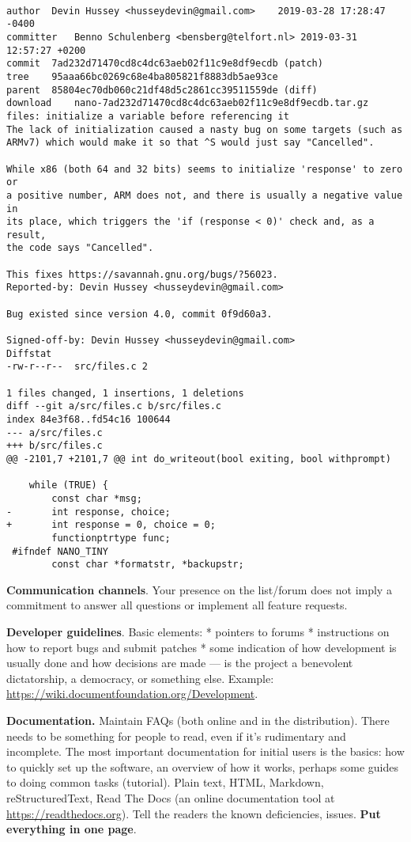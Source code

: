 \documentclass[landscape,30pt]{foils}
\begin{document}
{\tiny
\begin{verbatim}

author	Devin Hussey <husseydevin@gmail.com>	2019-03-28 17:28:47 -0400
committer	Benno Schulenberg <bensberg@telfort.nl>	2019-03-31 12:57:27 +0200
commit	7ad232d71470cd8c4dc63aeb02f11c9e8df9ecdb (patch)
tree	95aaa66bc0269c68e4ba805821f8883db5ae93ce
parent	85804ec70db060c21df48d5c2861cc39511559de (diff)
download	nano-7ad232d71470cd8c4dc63aeb02f11c9e8df9ecdb.tar.gz
files: initialize a variable before referencing it
The lack of initialization caused a nasty bug on some targets (such as
ARMv7) which would make it so that ^S would just say "Cancelled".

While x86 (both 64 and 32 bits) seems to initialize 'response' to zero or
a positive number, ARM does not, and there is usually a negative value in
its place, which triggers the 'if (response < 0)' check and, as a result,
the code says "Cancelled".

This fixes https://savannah.gnu.org/bugs/?56023.
Reported-by: Devin Hussey <husseydevin@gmail.com>

Bug existed since version 4.0, commit 0f9d60a3.

Signed-off-by: Devin Hussey <husseydevin@gmail.com>
Diffstat
-rw-r--r--	src/files.c	2	
		
1 files changed, 1 insertions, 1 deletions
diff --git a/src/files.c b/src/files.c
index 84e3f68..fd54c16 100644
--- a/src/files.c
+++ b/src/files.c
@@ -2101,7 +2101,7 @@ int do_writeout(bool exiting, bool withprompt)
 
 	while (TRUE) {
 		const char *msg;
-		int response, choice;
+		int response = 0, choice = 0;
 		functionptrtype func;
 #ifndef NANO_TINY
 		const char *formatstr, *backupstr;
\end{verbatim}
}


{\bf Communication channels}.  Your presence on the list/forum does not imply a commitment to answer all questions or implement all feature requests.

{\bf Developer guidelines}. Basic elements: *  pointers to forums  * instructions on how to report bugs and submit patches  *  some indication of how development is usually done and how decisions are made — is the project a
benevolent dictatorship, a democracy, or something else.  Example: \url{https://wiki.documentfoundation.org/Development}.

{\bf Documentation.}  Maintain FAQs (both online and in the
distribution). There needs to be something for people to read, even if
it's rudimentary and incomplete. The most important documentation for
initial users is the basics: how to quickly set up the software, an
overview of how it works, perhaps some guides to doing common tasks
(tutorial).  Plain text, HTML, Markdown, reStructuredText, Read The
Docs (an online documentation tool at \url{https://readthedocs.org}).  Tell the readers the known
deficiencies, issues.  {\bf Put everything in one page}.
\end{document}
